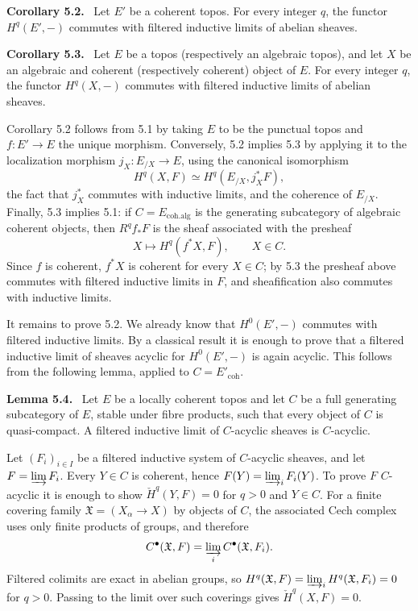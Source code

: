 \documentclass[11pt]{article}
\newcommand{\coh}{\mathrm{coh}}
\newcommand{\cohalg}{\mathrm{coh.alg}}
\newenvironment{statement}[1]{\par\medskip\noindent\textbf{#1.}\ }{\par\medskip}
\begin{document}
\begin{statement}{Corollary 5.2}
Let \(E'\) be a coherent topos. For every integer \(q\), the functor \(H^q(E',-)\) commutes with filtered inductive limits of abelian sheaves.
\end{statement}

\begin{statement}{Corollary 5.3}
Let \(E\) be a topos (respectively an algebraic topos), and let \(X\) be an algebraic and coherent (respectively coherent) object of \(E\). For every integer \(q\), the functor \(H^q(X,-)\) commutes with filtered inductive limits of abelian sheaves.
\end{statement}

Corollary 5.2 follows from 5.1 by taking \(E\) to be the punctual topos and \(f:E'\to E\) the unique morphism. Conversely, 5.2 implies 5.3 by applying it to the localization morphism \(j_X:E_{/X}\to E\), using the canonical isomorphism
\[
 H^q(X,F)\simeq H^q(E_{/X},j_X^*F),
\]
the fact that \(j_X^*\) commutes with inductive limits, and the coherence of \(E_{/X}\). Finally, 5.3 implies 5.1: if \(C=E_{\cohalg}\) is the generating subcategory of algebraic coherent objects, then \(R^q f_*F\) is the sheaf associated with the presheaf
\[
 X\longmapsto H^q(f^*X,F),\qquad X\in C.
\]
Since \(f\) is coherent, \(f^*X\) is coherent for every \(X\in C\); by 5.3 the presheaf above commutes with filtered inductive limits in \(F\), and sheafification also commutes with inductive limits.

It remains to prove 5.2. We already know that \(H^0(E',-)\) commutes with filtered inductive limits. By a classical result it is enough to prove that a filtered inductive limit of sheaves acyclic for \(H^0(E',-)\) is again acyclic. This follows from the following lemma, applied to \(C=E'_{\coh}\).

\begin{statement}{Lemma 5.4}
Let \(E\) be a locally coherent topos and let \(C\) be a full generating subcategory of \(E\), stable under fibre products, such that every object of \(C\) is quasi-compact. A filtered inductive limit of \(C\)-acyclic sheaves is \(C\)-acyclic.
\end{statement}

Let \((F_i)_{i\in I}\) be a filtered inductive system of \(C\)-acyclic sheaves, and let \(F=\varinjlim F_i\). Every \(Y\in C\) is coherent, hence \(F(Y)=\varinjlim_i F_i(Y)\). To prove \(F\) \(C\)-acyclic it is enough to show \(\check H^q(Y,F)=0\) for \(q>0\) and \(Y\in C\). For a finite covering family \(\mathfrak X=(X_\alpha\to X)\) by objects of \(C\), the associated Cech complex uses only finite products of groups, and therefore
\[
 C^{\bullet}(\mathfrak X,F)=\varinjlim_i C^{\bullet}(\mathfrak X,F_i).
\]
Filtered colimits are exact in abelian groups, so \(H^q(\mathfrak X,F)=\varinjlim_iH^q(\mathfrak X,F_i)=0\) for \(q>0\). Passing to the limit over such coverings gives \(\check H^q(X,F)=0\).
\end{document}
